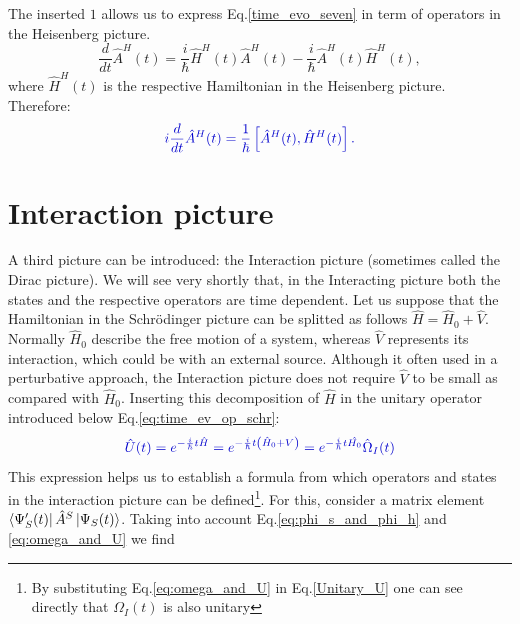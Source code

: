 \documentclass[
12pt, %
english, %
singlespacing, %
headsepline, %
]{MastersDoctoralThesis} %
\begin{document}
The inserted $ 1 $ allows us to express Eq.\enskip\eqref{time_evo_seven} in term of operators in the Heisenberg picture.
\begin{equation}
\frac{d}{dt}\hat{A}^{H}(t)
	=\frac{i}{\hbar}
	\hat{H}^{H}(t)\hat{A}^{H}(t)
	-
	\frac{i}{\hbar}
	\hat{A}^{H}(t)\hat{H}^{H}(t),
\end{equation} 
where $ \hat{H}^{H}(t) $ is the respective Hamiltonian in the Heisenberg  picture.
Therefore:
\begin{equation}\label{eq:Heisenberg_time_dep._eq.}
\textcolor[RGB]{0,0,204}{
i\frac{d}{d t}\hat{A}^{H}(t)=
\frac{1}{\hbar}\left[ \hat{A}^{H}(t),\hat{H}^{H}(t)\right] 
.
}
\end{equation} 
\section{Interaction picture}\label{Interactionpicture}
A third picture can be introduced: the Interaction picture (sometimes called the Dirac picture). We will see very shortly that, in the Interacting picture both the states and the respective operators are time dependent.
Let us suppose that the Hamiltonian in the Schrödinger picture can be splitted as follows $ \hat{H} = \hat{H}_{0}+\hat{V} $. Normally $ \hat{H}_{0} $ describe the free motion of a system, whereas  $ \hat{V} $ represents its interaction, which could be with an external source. Although it often used in a perturbative approach, the Interaction picture does not require $ \hat{V} $  to be small as compared with $ \hat{H}_{0} $. 
Inserting this decomposition of $ \hat{H} $ in the unitary operator introduced below Eq.\enskip\eqref{eq:time_ev_op_schr}:
\begin{equation}\label{eq:omega_and_U}
\textcolor[RGB]{0,0,204}{
\hat{U}(t)=e^{-\frac{i}{\hbar}t \hat{H}}
=e^{-\frac{i}{\hbar}t\left(  \hat{H}_{0}+V\right) }
=
e^{-\frac{i}{\hbar}t \hat{H_{0}}}
\hat{\Omega}_{I} (t)
}
\end{equation}
This expression helps us to establish a formula from which operators and states in the interaction picture can be defined\footnote{By substituting Eq.\enskip\eqref{eq:omega_and_U} in Eq.\enskip\eqref{Unitary_U} one can see directly that $ \Omega_{I}(t) $ is also unitary}. For this, consider a matrix element $ 	\bra{\Psi_{S}^{\prime}(t)}
	\hat{A}^{S}
	\ket{\Psi_{S}(t)} $. Taking into account Eq.\enskip\eqref{eq:phi_s_and_phi_h} and \eqref{eq:omega_and_U} we find
\end{document}
